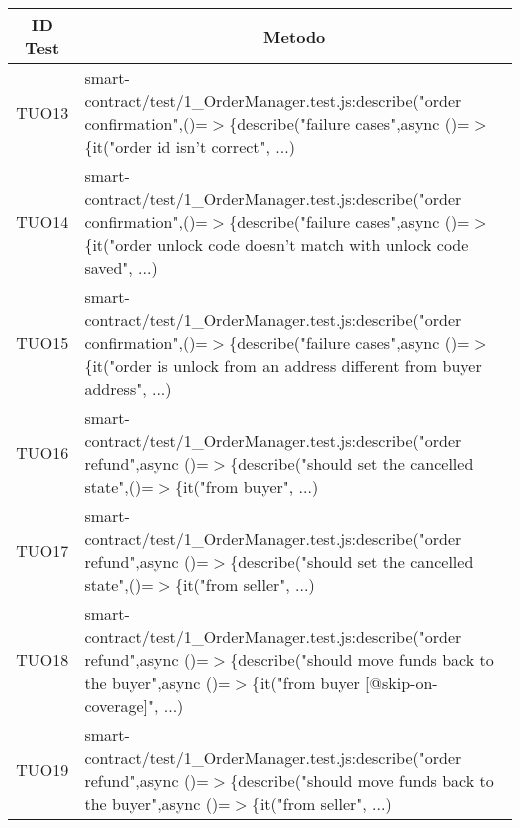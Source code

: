 \begin{table}[H]
  \centering
  \renewcommand{\arraystretch}{1.8}
  \begin{tabular}{c|p{15cm}}
    \rowcolor[HTML]{125E28}
    \color[HTML]{FFFFFF}\textbf{ID Test}
          & \multicolumn{1}{c}{\color[HTML]{FFFFFF}\textbf{Metodo}}                                                                                                                                                  \\
    \hline
    TUO13 & smart-contract/test/1\_OrderManager.test.js:describe("order confirmation",\newline()=$>$\{describe("failure cases",async ()=$>$\{it("order id isn't correct", ...)                                       \\
    TUO14 & smart-contract/test/1\_OrderManager.test.js:describe("order confirmation",\newline()=$>$\{describe("failure cases",async ()=$>$\{it("order unlock code doesn't match with unlock code saved", ...)       \\
    TUO15 & smart-contract/test/1\_OrderManager.test.js:describe("order confirmation",\newline()=$>$\{describe("failure cases",async ()=$>$\{it("order is unlock from an address different from buyer address", ...) \\
    TUO16 & smart-contract/test/1\_OrderManager.test.js:describe("order refund",\newline async ()=$>$\{describe("should set the cancelled state",()=$>$\{it("from buyer", ...)                                       \\
    TUO17 & smart-contract/test/1\_OrderManager.test.js:describe("order refund",\newline async ()=$>$\{describe("should set the cancelled state",()=$>$\{it("from seller", ...)                                      \\
    TUO18 & smart-contract/test/1\_OrderManager.test.js:describe("order refund",\newline async ()=$>$\{describe("should move funds back to the buyer",async ()=$>$\{it("from buyer [@skip-on-coverage]", ...)        \\
    TUO19 & smart-contract/test/1\_OrderManager.test.js:describe("order refund",\newline async ()=$>$\{describe("should move funds back to the buyer",async ()=$>$\{it("from seller", ...)                           \\

\end{tabular}
\end{table}
